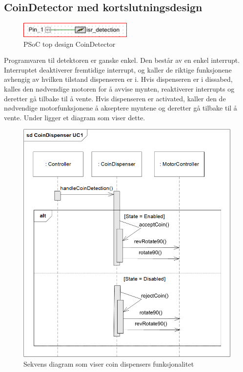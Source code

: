 \documentclass[Softwaredesign/Softwaredesign_main.tex]{subfiles}
\begin{document}
\subsection{CoinDetector med kortslutningsdesign} 
\begin{figure}[H]
    \centering
    \includegraphics[width=0.5\textwidth]{Softwaredesign/CoinSensor/graphics/TopDesign-CoinDetector.png}
    \caption{PSoC top design CoinDetector}
    \label{fig:CoinDetector_PSoC_Design}
    \end{figure}
Programvaren til detektoren er ganske enkel. Den består av en enkel interrupt. Interruptet deaktiverer fremtidige interrupt, og kaller de riktige funksjonene avhengig av hvilken tilstand dispenseren er i. Hvis dispenseren er i dissabed, kalles den nødvendige motoren for å avvise mynten, reaktiverer interrupts og deretter gå tilbake til å vente. Hvis dispenseren er activated, kaller den de nødvendige motorfunksjonene å akseptere myntene og deretter gå tilbake til å vente. Under ligger et diagram som viser dette.
\begin{figure}[H]
    \centering
    \includegraphics[width=\textwidth]{Softwaredesign/CoinSensor/graphics/sd_CoinDispenser.png}
    \caption{Sekvens diagram som viser coin dispensers funksjonalitet}
    \label{fig:SDCoinDispAPP}
\end{figure}
\end{document}
